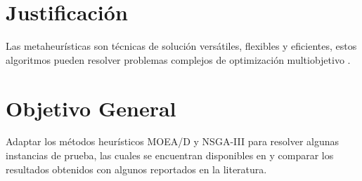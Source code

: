 \documentclass[letterpaper,10pt]{article}
\begin{document}
\section{Justificación}

% 
Las metaheurísticas son técnicas de solución versátiles, flexibles y eficientes, estos algoritmos pueden resolver problemas complejos de optimización multiobjetivo \cite{coello1999comprehensive} .
\newline
% 
%  	

\section{Objetivo General}

Adaptar los métodos heurísticos MOEA/D y NSGA-III para resolver algunas instancias de prueba, las cuales se encuentran disponibles en \cite{zhang2008multiobjective} y comparar los resultados obtenidos con algunos reportados en la literatura.
\end{document}
